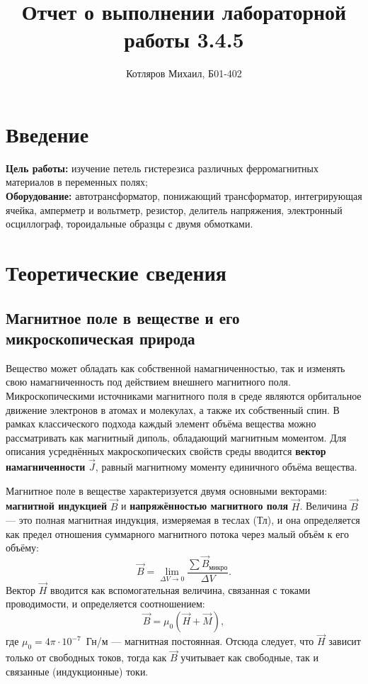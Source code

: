 \documentclass[a4paper]{article}
\title{\textbf{Отчет о выполнении лабораторной работы 3.4.5}}
\date{}
\author{Котляров Михаил, Б01-402}
\begin{document}
\maketitle
	
	\section{Введение}
	
	\textbf{Цель работы:} изучение петель гистерезиса различных ферромагнитных материалов в переменных полях;\\

	\textbf{Оборудование:} автотрансформатор, понижающий трансформатор, интегрирующая ячейка, амперметр и вольтметр, резистор, делитель напряжения, электронный осциллограф, тороидальные образцы с двумя обмотками.
	
	\section{Теоретические сведения}

\subsection*{Магнитное поле в веществе и его микроскопическая природа}

Вещество может обладать как собственной намагниченностью, так и изменять свою намагниченность под действием внешнего магнитного поля. Микроскопическими источниками магнитного поля в среде являются орбитальное движение электронов в атомах и молекулах, а также их собственный спин. В рамках классического подхода каждый элемент объёма вещества можно рассматривать как магнитный диполь, обладающий магнитным моментом. Для описания усреднённых макроскопических свойств среды вводится \textbf{вектор намагниченности} $\vec{J}$, равный магнитному моменту единичного объёма вещества.

Магнитное поле в веществе характеризуется двумя основными векторами: \textbf{магнитной индукцией} $\vec{B}$ и \textbf{напряжённостью магнитного поля} $\vec{H}$. Величина $\vec{B}$ — это полная магнитная индукция, измеряемая в теслах (Тл), и она определяется как предел отношения суммарного магнитного потока через малый объём к его объёму:
\begin{equation}
\vec{B} = \lim_{\Delta V \to 0} \frac{\sum \vec{B}_{\text{микро}}}{\Delta V}.
\end{equation}
Вектор $\vec{H}$ вводится как вспомогательная величина, связанная с токами проводимости, и определяется соотношением:
\begin{equation}
\vec{B} = \mu_0 (\vec{H} + \vec{M}),
\end{equation}
где $\mu_0 = 4\pi \cdot 10^{-7}$~Гн/м — магнитная постоянная. Отсюда следует, что $\vec{H}$ зависит только от свободных токов, тогда как $\vec{B}$ учитывает как свободные, так и связанные (индукционные) токи.
\end{document}
